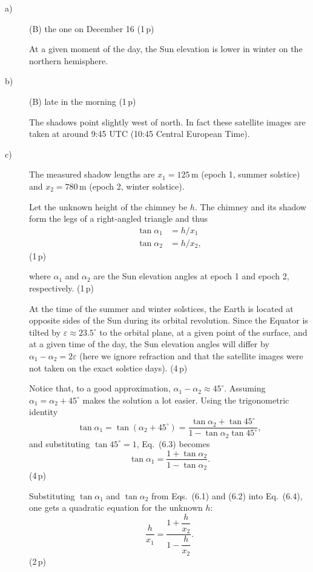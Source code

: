 \begin{description}
\item[a)] (B) the one on December 16 \hfill(1\,p)

  At a given moment of the day, the Sun elevation is lower in winter on the
  northern hemisphere.

\item[b)] (B) late in the morning \hfill(1\,p)

  The shadows point slightly west of north. In fact these satellite images are
  taken at around 9:45 UTC (10:45 Central European Time).

\item[c)] The measured shadow lengths are $x_1 = 125$\,m (epoch 1, summer
  solstice) and $x_2 = 780$\,m (epoch 2, winter solstice).

  Let the unknown height of the chimney be $h$. The chimney and its shadow form
  the legs of a right-angled triangle and thus
  \begin{align*}
    \tan\alpha_1 &= h/x_1 \tag{6.1}\\
    \tan\alpha_2 &= h/x_2, \tag{6.2}
  \end{align*}
  \hfill(1\,p)

  where $\alpha_1$ and $\alpha_2$ are the Sun elevation angles at epoch 1 and
  epoch 2, respectively. \hfill(1\,p)

  At the time of the summer and winter solstices, the Earth is located at
  opposite sides of the Sun during its orbital revolution. Since the Equator is
  tilted by $\varepsilon \approx 23.5^\circ$ to the orbital plane, at a given
  point of the surface, and at a given time of the day, the Sun elevation
  angles will differ by $\alpha_1 - \alpha_2 = 2\varepsilon$ (here we ignore
  refraction and that the satellite images were not taken on the exact solstice
  days). \hfill(4\,p)

  Notice that, to a good approximation, $\alpha_1 - \alpha_2 \approx 45^\circ$.
  Assuming $\alpha_1 = \alpha_2 + 45^\circ$ makes the solution a lot easier.
  Using the trigonometric identity
  \[
    \tan\alpha_1 = \tan(\alpha_2 + 45^\circ)
      = \frac{\tan\alpha_2 + \tan 45^\circ}{1 - \tan\alpha_2 \tan 45^\circ},
    \tag{6.3}
  \]
  and substituting $\tan 45^\circ = 1$, Eq.~(6.3) becomes
  \[
    \tan\alpha_1 = \frac{1 + \tan\alpha_2}{1 - \tan\alpha_2}. \tag{6.4}
  \]
  \hfill(4\,p)

  Substituting $\tan\alpha_1$ and $\tan\alpha_2$ from Eqs.~(6.1) and (6.2) into
  Eq.~(6.4), one gets a quadratic equation for the unknown $h$:
  \[
    \frac{h}{x_1} = \frac{1 + \dfrac{h}{x_2}}{1 - \dfrac{h}{x_2}}. \tag{6.5}
  \]
  \hfill(2\,p)


\end{description}
